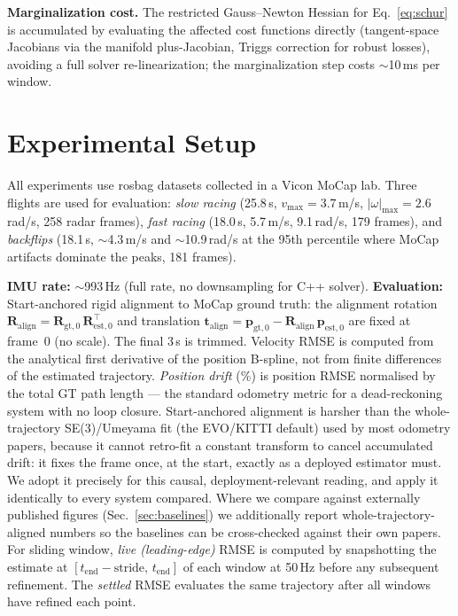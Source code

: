 \documentclass[conference]{IEEEtran}
\begin{document}
\textbf{Marginalization cost.}
The restricted Gauss--Newton Hessian for Eq.~\eqref{eq:schur} is
accumulated by evaluating the affected cost functions directly
(tangent-space Jacobians via the manifold plus-Jacobian, Triggs
correction for robust losses), avoiding a full solver re-linearization;
the marginalization step costs $\sim$10\,ms per window.

\section{Experimental Setup}
\label{sec:setup}

All experiments use rosbag datasets collected in a Vicon MoCap lab.
Three flights are used for evaluation: \emph{slow racing}
(25.8\,s, $v_{\max}{=}3.7$\,m/s, $|\omega|_{\max}{=}2.6$\,rad/s,
258 radar frames), \emph{fast racing}
(18.0\,s, 5.7\,m/s, 9.1\,rad/s, 179 frames), and \emph{backflips}
(18.1\,s, $\sim$4.3\,m/s and $\sim$10.9\,rad/s at the 95th percentile
where MoCap artifacts dominate the peaks, 181 frames).

\textbf{IMU rate:} $\sim$993\,Hz (full rate, no downsampling for C++ solver).
\textbf{Evaluation:} Start-anchored rigid alignment to MoCap ground
truth: the alignment rotation $\mathbf{R}_\mathrm{align} =
\mathbf{R}_{\mathrm{gt},0}\,\mathbf{R}_{\mathrm{est},0}^\top$
and translation $\mathbf{t}_\mathrm{align} =
\mathbf{p}_{\mathrm{gt},0} - \mathbf{R}_\mathrm{align}\,
\mathbf{p}_{\mathrm{est},0}$ are fixed at frame~0 (no scale).
The final 3\,s is trimmed.  Velocity RMSE is computed from the
analytical first derivative of the position B-spline, not from finite
differences of the estimated trajectory.
\emph{Position drift} (\%) is position RMSE normalised by the total
GT path length --- the standard odometry metric for a
dead-reckoning system with no loop closure.
Start-anchored alignment is harsher than the whole-trajectory
SE(3)/Umeyama fit (the EVO/KITTI default) used by most odometry papers,
because it cannot retro-fit a constant transform to cancel accumulated
drift: it fixes the frame once, at the start, exactly as a deployed
estimator must.  We adopt it precisely for this causal,
deployment-relevant reading, and apply it identically to every system
compared.  Where we compare against externally published figures
(Sec.~\ref{sec:baselines}) we additionally report whole-trajectory-aligned
numbers so the baselines can be cross-checked against their own papers.
For sliding window, \emph{live (leading-edge)} RMSE is computed by
snapshotting the estimate at $[t_\text{end}{-}\text{stride},\, t_\text{end}]$
of each window at 50\,Hz before any subsequent refinement.  The
\emph{settled} RMSE evaluates the same trajectory after all windows
have refined each point.
\end{document}
